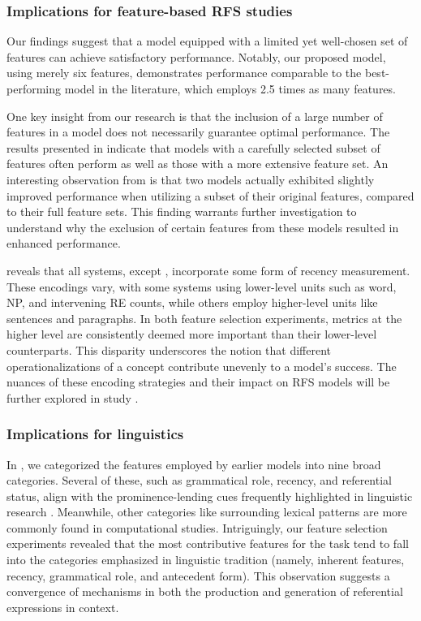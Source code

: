 \subsubsection{Implications for feature-based RFS studies}

Our findings suggest that a model equipped with a limited yet well-chosen set of features can achieve satisfactory performance. Notably, our proposed model, using merely six features, demonstrates performance comparable to the best-performing model in the \context literature, which employs 2.5 times as many features.

One key insight from our research is that the inclusion of a large number of features in a model does not necessarily guarantee optimal performance. The results presented in  indicate that models with a carefully selected subset of features often perform as well as those with a more extensive feature set. An interesting observation from  is that two models actually exhibited slightly improved performance when utilizing a subset of their original features, compared to their full feature sets. This finding warrants further investigation to understand why the exclusion of certain features from these models resulted in enhanced performance.

 reveals that all systems, except , incorporate some form of recency measurement. These encodings vary, with some systems using lower-level units such as word, NP, and intervening RE counts, while others employ higher-level units like sentences and paragraphs. In both feature selection experiments, metrics at the higher level are consistently deemed more important than their lower-level counterparts. This disparity underscores the notion that different operationalizations of a concept contribute unevenly to a model's success. The nuances of these encoding strategies and their impact on RFS models will be further explored in study \studC.

\subsubsection{Implications for linguistics}

In , we categorized the features employed by earlier \context models into nine broad categories. Several of these, such as grammatical role, recency, and referential status, align with the prominence-lending cues frequently highlighted in linguistic research \citep{Kaiser2011,gundel2003,Heusinger2019}. Meanwhile, other categories like surrounding lexical patterns are more commonly found in computational studies. Intriguingly, our feature selection experiments revealed that the most contributive features for the \context task tend to fall into the categories emphasized in linguistic tradition (namely, inherent features, recency, grammatical role, and antecedent form). This observation suggests a convergence of mechanisms in both the production and generation of referential expressions in context.

